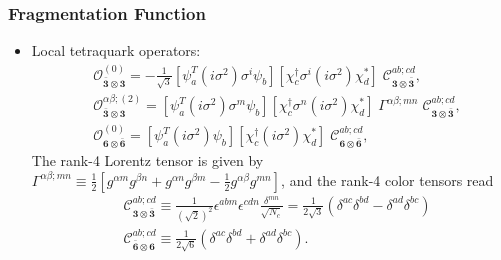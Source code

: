 \begin{frame}
	\frametitle{Fragmentation Function}

	
	\begin{itemize}
		\item Local tetraquark operators:
		\begin{subequations}
			\begin{align}
			 &\mathcal{O}^{(0)}_{\mathbf{\bar 3}\otimes\mathbf{3}}=-\frac{1}{\sqrt{3}}[\psi_a^T(i\sigma^2)\sigma^i\psi_b] [\chi_c^{\dagger}\sigma^i (i\sigma^2)\chi_d^*]\;
			 \mathcal{C}^{ab;cd}_{\mathbf{3}\otimes\bar{\mathbf{3}}},
			\\
			 &\mathcal{O}^{\alpha\beta;(2)}_{\mathbf{\bar 3}\otimes\mathbf{3}} =[\psi_a^T(i\sigma^2)\sigma^m\psi_b] [\chi_c^{\dagger}\sigma^n(i\sigma^2)\chi_d^*]\;{\Gamma^{\alpha\beta;mn}}
			 \;\mathcal{C}^{ab;cd}_{\mathbf{3}\otimes\bar{\mathbf{3}}},
			\\
			&{\mathcal{O}^{(0)}_{\mathbf{6}\otimes\bar{\mathbf{6}}} =
			[\psi_a^T(i\sigma^2)\psi_b] [\chi_c^{\dagger}(i\sigma^2)\chi_d^*]\;
			\mathcal{C}^{ab;cd}_{\mathbf{6}\otimes\bar{\mathbf{6}}}},
			\end{align}
			\label{NRQCD:composite:operators}
		\end{subequations}
		The rank-4 Lorentz tensor is given by $\Gamma^{\alpha\beta;mn}\equiv {\frac{1}{2}}[g^{\alpha m} g^{\beta n}+g^{\alpha n} g^{\beta m}-\frac{1}{2} g^{\alpha \beta} g^{mn}]$,
		and the rank-4 color tensors read
		\begin{subequations}
		\begin{align}
		& {\mathcal{C}^{ab;cd}_{\mathbf{3} \otimes\bar{\mathbf{3}}}\equiv \frac{1}{(\sqrt{2})^2} \epsilon^{abm}\epsilon^{cdn}\frac{\delta^{mn}}{\sqrt{N_c}}=\frac{1}{2\sqrt{3}}(\delta^{ac}\delta^{bd}-\delta^{ad}\delta^{bc})}
		\\
		& \mathcal{C}^{ab;cd}_{\bar{\mathbf{6}}\otimes\mathbf{6}}
		\equiv \frac{1}{2\sqrt{6}}(\delta^{ac}\delta^{bd}+\delta^{ad}\delta^{bc}).
		\end{align}
		\label{color:tensor}
		\end{subequations}
	\end{itemize}
\end{frame}

